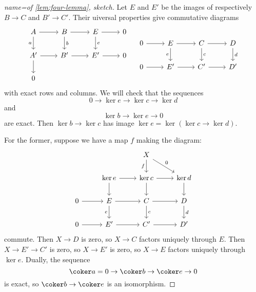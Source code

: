 \begin{proof}[name={of \cref{lem:four-lemma}, sketch}]
Let \(E\) and \(E'\) be the images of respectively \(B\to C\) and \(B'\to C'\).
Their uiversal properties give commutative diagrams
\begin{align*}
  \begin{tikzcd}[ampersand replacement=\&]
    A \ar[r] \ar[d, "a"'] \& B \ar[r] \ar[d, "b"] \& E \ar[r] \ar[d, "e"] \& 0 \\
    A' \ar[r] \ar[d] \& B' \ar[r] \& E' \ar[r] \& 0 \\
    0
  \end{tikzcd}
  &&
  \begin{tikzcd}[ampersand replacement=\&]
    0 \ar[r] \& E \ar[r] \ar[d, "e"'] \& C \ar[r] \ar[d, "c"] \& D \ar[d, "d"] \\
    0 \ar[r] \& E' \ar[r] \& C' \ar[r] \& D'
  \end{tikzcd}
\end{align*}
with exact rows and columns.
We will check that the sequences
\[ 0 \to \ker e \to \ker c\to \ker d \]
and
\[ \ker b\to \ker e\to 0 \]
are exact.
Then \(\ker b\to\ker c\) has image \(\ker e=\ker(\ker c\to\ker d)\).

For the former, suppose we have a map \(f\) making the diagram:
\begin{equation*}
  \begin{tikzcd}
    & & X \ar[rd, "0"] \ar[d, "f"'] \\
    & \ker e \ar[r] \ar[d] & \ker c \ar[r] \ar[d] & \ker d \ar[d] \\
    0 \ar[r] & E \ar[r] \ar[d, "e"'] & C \ar[r] \ar[d, "c"] & D \ar[d, "d"] \\
    0 \ar[r] & E' \ar[r] & C' \ar[r] & D'
  \end{tikzcd}
\end{equation*}
commute.
Then \(X\to D\) is zero, so \(X\to C\) factors uniquely through \(E\).
Then \(X\to E'\to C'\) is zero, so \(X\to E'\) is zero, so \(X\to E\) factors uniquely through \(\ker e\).
Dually, the sequence
\[\coker a=0\to\coker b\to\coker e\to 0\]
is exact, so \(\coker b\to\coker e\) is an isomorphism.


\end{proof}
